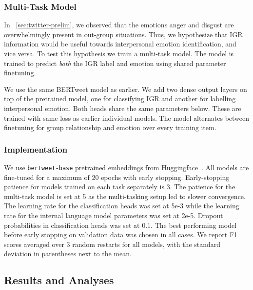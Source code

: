 \subsubsection{Multi-Task Model}

In \textsection~\ref{sec:twitter-prelim}, we observed that the emotions anger and disgust are overwhelmingly present in out-group situations. Thus, we hypothesize that IGR information would be useful towards interpersonal emotion identification, and vice versa. To test this hypothesis we train a multi-task model. The model is trained to predict \emph{both} the IGR label and emotion using shared parameter finetuning.

We use the same BERTweet model as earlier. We add two dense output layers on top of the pretrained model, one for classifying IGR and another for labelling interpersonal emotion. Both heads share the same parameters below. These are trained with same loss as earlier individual models. The model alternates between finetuning for group relationship and emotion over every training item.

\subsubsection{Implementation}
We use \texttt{bertweet-base} pretrained embeddings from Huggingface~\citep{wolf-etal-2020-transformers}. All models are fine-tuned for a maximum of 20 epochs with early stopping. Early-stopping patience for models trained on each task separately is 3. The patience for the multi-task model is set at 5 as the multi-tasking setup led to slower convergence. The learning rate for the classification heads was set at 5e-3 while the learning rate for the internal language model parameters was set at 2e-5. Dropout probabilities in classification heads was set at 0.1. The best performing model before early stopping on validation data was chosen in all cases. We report F1 scores averaged over 3 random restarts for all models, with the standard deviation in parentheses next to the mean.

\subsection{Results and Analyses}
\label{subsec:twitter-results}



